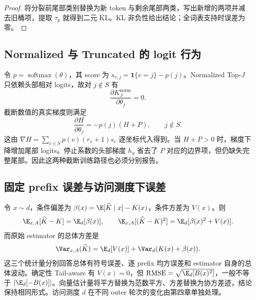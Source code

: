 \begin{proof}
将分裂前尾部类别替换为新 token 与剩余尾部两类，写出新增的两项并减去旧桶项，提取 $\tau_p$ 就得到二元 KL。KL 非负性给出结论；全词表支持时误差为零。
\end{proof}

\subsection{Normalized 与 Truncated 的 logit 行为}

令 $p=\operatorname{softmax}(\theta)$，其 score 为 $s_{v,j}=\mathbf1\{v=j\}-p(j)$。Normalized Top-$J$ 只依赖头部相对 logits，故对 $j\notin S$ 有
\[
 \frac{\partial K^{\mathrm{norm}}_J}{\partial\theta_j}=0.
\]
截断数值的真实梯度则满足
\[
 \frac{\partial H}{\partial\theta_j}=-p(j)(H+P),\qquad j\notin S.
\]
这由 $\nabla H=\sum_{v\in S}p(v)(r_v+1)s_v$ 逐坐标代入得到。当 $H+P>0$ 时，梯度下降增加尾部 logits。停止系数的头部梯度 $h_g$ 省去了 $P$ 对应的边界项，但仍缺失完整尾部。因此这两种截断训练路径也必须分别报告。

\subsection{固定 prefix 误差与访问测度下误差}

令 $x\sim d$，条件偏差为 $\beta(x)=\E[\widehat K\mid x]-K(x)$，条件方差为 $V(x)$。则
\[
 \E_{x,A}[\widehat K-K]=\E_d[\beta(x)],\qquad
 \E_{x,A}[(\widehat K-K)^2]=\E_d[\beta(x)^2+V(x)].
\]
而原始 estimator 的总体方差是
\[
 \Var_{x,A}(\widehat K)
 =\E_d[V(x)]+\Var_d(K(x)+\beta(x)).
\]
这三个统计量分别回答总体有符号误差、逐 prefix 均方误差和 estimator 自身的总体波动。确定性 Tail-aware 有 $V(x)=0$，但 $\operatorname{RMSE}=\sqrt{\E_d[B(x)^2]}$，一般不等于 $|\E_d[-B(x)]|$。向量估计量将平方替换为范数平方、方差替换为协方差迹，结论保持相同形式。访问测度 $d$ 在不同 outer 轮次的变化由第四章单独处理。
